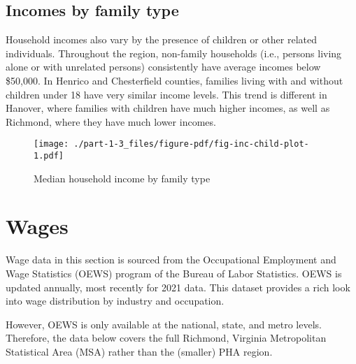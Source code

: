 \documentclass[
  letterpaper,
  DIV=11,
  numbers=noendperiod]{scrreprt}
\begin{document}
\hypertarget{incomes-by-family-type}{%
\subsection{Incomes by family type}\label{incomes-by-family-type}}

Household incomes also vary by the presence of children or other related
individuals. Throughout the region, non-family households (i.e., persons
living alone or with unrelated persons) consistently have average
incomes below \$50,000. In Henrico and Chesterfield counties, families
living with and without children under 18 have very similar income
levels. This trend is different in Hanover, where families with children
have much higher incomes, as well as Richmond, where they have much
lower incomes.

\begin{figure}

{\centering \texttt{[image: ./part-1-3\_files/figure-pdf/fig-inc-child-plot-1.pdf]}

}

\caption{\label{fig-inc-child-plot}Median household income by family
type}

\end{figure}

\hypertarget{wages}{%
\section{Wages}\label{wages}}

\begin{tcolorbox}[enhanced jigsaw, colback=white, colbacktitle=quarto-callout-note-color!10!white, bottomrule=.15mm, opacitybacktitle=0.6, colframe=quarto-callout-note-color-frame, breakable, opacityback=0, bottomtitle=1mm, titlerule=0mm, coltitle=black, leftrule=.75mm, left=2mm, title=\textcolor{quarto-callout-note-color}{\faInfo}\hspace{0.5em}{Note}, toptitle=1mm, arc=.35mm, rightrule=.15mm, toprule=.15mm]
Wage data in this section is sourced from the Occupational Employment
and Wage Statistics (OEWS) program of the Bureau of Labor Statistics.
OEWS is updated annually, most recently for 2021 data. This dataset
provides a rich look into wage distribution by industry and occupation.

However, OEWS is only available at the national, state, and metro
levels. Therefore, the data below covers the full Richmond, Virginia
Metropolitan Statistical Area (MSA) rather than the (smaller) PHA
region.
\end{tcolorbox}
\end{document}
